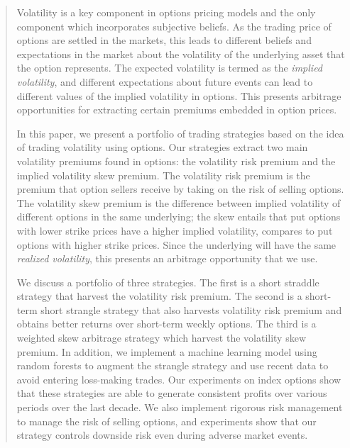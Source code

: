 \documentclass[10pt]{article}
\theoremstyle{definition}
\begin{document}
\begin{abstract}
Volatility is a key component in options pricing models and the only component which incorporates subjective beliefs. As the trading price of options are settled in the markets, this leads to different beliefs and expectations in the market about the volatility of the underlying asset that the option represents. The expected volatility is termed as the \textit{implied volatility}, and different expectations about future events can lead to different values of the implied volatility in options. This presents arbitrage opportunities for extracting certain premiums embedded in option prices.

In this paper, we present a portfolio of trading strategies based on the idea of trading volatility using options. Our strategies extract two main volatility premiums found in options: the volatility risk premium and the implied volatility skew premium. The volatility risk premium is the premium that option sellers receive by taking on the risk of selling options. The volatility skew premium is the difference between implied volatility of different options in the same underlying; the skew entails that put options with lower strike prices have a higher implied volatility, compares to put options with higher strike prices. Since the underlying will have the same \textit{realized volatility}, this presents an arbitrage opportunity that we use.

We discuss a portfolio of three strategies. The first is a short straddle strategy that harvest the volatility risk premium. The second is a short-term short strangle strategy that also harvests volatility risk premium and obtains better returns over short-term weekly options. The third is a weighted skew arbitrage strategy which harvest the volatility skew premium. In addition, we implement a machine learning model using random forests to augment the strangle strategy and use recent data to avoid entering loss-making trades. Our experiments on index options show that these strategies are able to generate consistent profits over various periods over the last decade. We also implement rigorous risk management to manage the risk of selling options, and experiments show that our strategy controls downside risk even during adverse market events.
    
\end{abstract}
\end{document}
